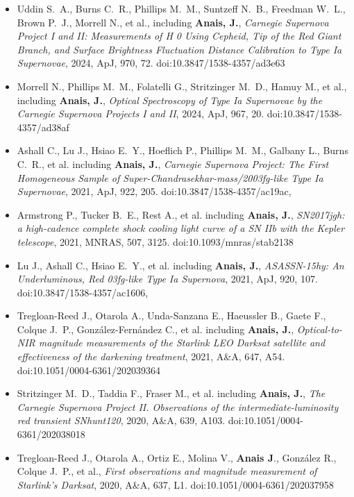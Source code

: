 \begin{itemize}    
    \item {Uddin S.~A., Burns C.~R., Phillips M.~M., Suntzeff N.~B., Freedman W.~L., Brown P.~J., Morrell N., et al., including \textbf{Anais, J.}, \textit{Carnegie Supernova Project I and II: Measurements of H 0 Using Cepheid, Tip of the Red Giant Branch, and Surface Brightness Fluctuation Distance Calibration to Type Ia Supernovae}, 2024, ApJ, 970, 72. doi:10.3847/1538-4357/ad3e63}
    \item {Morrell N., Phillips M.~M., Folatelli G., Stritzinger M.~D., Hamuy M., et al., including \textbf{Anais, J.}, \textit{Optical Spectroscopy of Type Ia Supernovae by the Carnegie Supernova Projects I and II}, 2024, ApJ, 967, 20. doi:10.3847/1538-4357/ad38af}
    \item {Ashall C., Lu J., Hsiao E.~Y., Hoeflich P., Phillips M.~M., Galbany L., Burns C.~R., et al. including \textbf{Anais, J.}, \textit{Carnegie Supernova Project: The First Homogeneous Sample of Super-Chandrasekhar-mass/2003fg-like Type Ia Supernovae}, 2021, ApJ, 922, 205. doi:10.3847/1538-4357/ac19ac},
    \item {Armstrong P., Tucker B.~E., Rest A., et al. including \textbf{Anais, J.}, \textit{SN2017jgh: a high-cadence complete shock cooling light curve of a SN IIb with the Kepler telescope}, 2021, MNRAS, 507, 3125. doi:10.1093/mnras/stab2138}
    \item {Lu J., Ashall C., Hsiao E.~Y., et al. including \textbf{Anais, J.}, \textit{ASASSN-15hy: An Underluminous, Red 03fg-like Type Ia Supernova}, 2021, ApJ, 920, 107. doi:10.3847/1538-4357/ac1606},
    \item {Tregloan-Reed J., Otarola A., Unda-Sanzana E., Haeussler B., Gaete F., Colque J.~P., Gonz{\'a}lez-Fern{\'a}ndez C., et al. including \textbf{Anais, J.}, \textit{Optical-to-NIR magnitude measurements of the Starlink LEO Darksat satellite and effectiveness of the darkening treatment}, 2021, A\&A, 647, A54. doi:10.1051/0004-6361/202039364}
    \item {Stritzinger M.~D., Taddia F., Fraser M., et al. including \textbf{Anais, J.}, \textit{The Carnegie Supernova Project II. Observations of the intermediate-luminosity red transient SNhunt120}, 2020, A\&A, 639, A103. doi:10.1051/0004-6361/202038018}
    \item {Tregloan-Reed J., Otarola A., Ortiz E., Molina V., \textbf{Anais J}., Gonz{\'a}lez R., Colque J.~P., et al., \textit{First observations and magnitude measurement of Starlink's Darksat}, 2020, A\&A, 637, L1. doi:10.1051/0004-6361/202037958}

\end{itemize}
